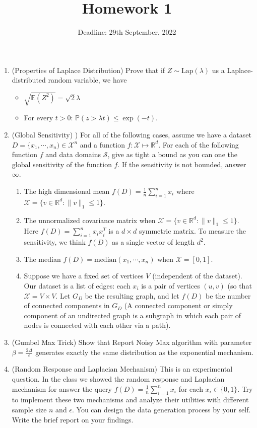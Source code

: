 \documentclass[11pt]{article}
\date{\displaydate{date}}
\begin{document}
\author{Deadline: 29th September, 2022}
\title{Homework 1}
\maketitle

\medskip

\begin{enumerate}
\item (Properties of Laplace Distribution) 
Prove that if $Z\sim \text{Lap}(\lambda)$ us a Laplace-distributed random variable, we have 
\begin{itemize}
	\item $\sqrt{\mathbb{E}(Z^2)}=\sqrt{2}\lambda $
    \item For every $t>0$: $\mathbb{P}(z> \lambda t)\leq \exp(-t)$. 
\end{itemize}
\item (Global Sensitivity) ) For all of the following cases, assume we have a dataset $D=\{x_1, \cdots, x_n)\in \mathcal{X}^n$ and a function $f: \mathcal{X}\mapsto \mathbb{R}^d$. For each of the following function $f$ and data domains $\mathcal{S}$,  give as tight a bound as you can one the global sensitivity of the function $f$. If the sensitivity is not bounded, answer $\infty$. 
\begin{enumerate}
\item The high dimensional mean $f(D)=\frac{1}{n}\sum_{i=1}^n x_i$ where $\mathcal{X}=\{v\in \mathbb{R}^d: \|v\|_1\leq 1\}$. 
\item The unnormalized covariance matrix when $\mathcal{X}=\{v\in \mathbb{R}^d: \|v\|_1\leq 1\}$. Here $f(D)=\sum_{i=1}^n x_i x_i^T$ is a $d\times d$ symmetric matrix. To measure the sensitivity, we think $f(D)$ as a single vector of length $d^2$. 
\item The median $f(D)=\text{median}(x_1, \cdots, x_n)$ when $\mathcal{X}=[0, 1]$. 
\item Suppose we have a fixed set of vertices $V$ (independent of the dataset). Our dataset is a list of edges: each $x_i$ is a pair of vertices $(u, v)$ (so that $\mathcal{X}=V\times V$. Let $G_D$ be the resulting graph, and let $f(D)$ be the number of connected components in $G_D$ (A connected component or simply component of an undirected graph is a subgraph in which each pair of nodes is connected with each other via a path).  

\end{enumerate}
\item  (Gumbel Max Trick) Show that Report Noisy Max algorithm with parameter $\beta=\frac{2\Delta}{\epsilon}$ generates 
exactly the same distribution as the exponential mechanism.
\item (Random Response and Laplacian Mechanism) This is an experimental question. In the class we showed the random response and Laplacian mechanism for answer the query $f(D)=\frac{1}{n}\sum_{i=1}^n x_i$ for each $x_i\in \{0, 1 \}$. Try to implement these two mechanisms and analyze their utilities with different sample size $n$ and $\epsilon$. You can design the data generation process by your self. Write the brief report on your findings. 

\end{enumerate}
\end{document}
